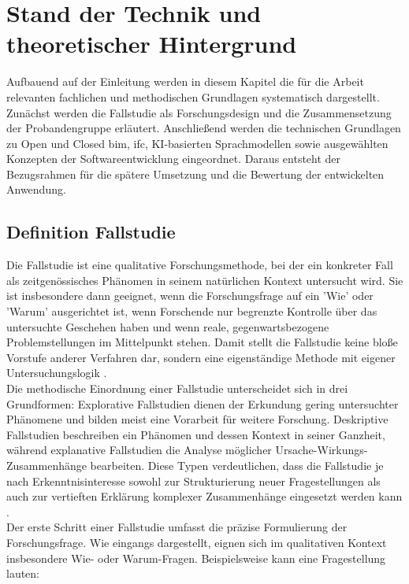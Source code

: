 \chapter{\textbf{Stand der Technik und theoretischer Hintergrund}}
\label{chap:state-of-the-art}

Aufbauend auf der Einleitung werden in diesem Kapitel die für die Arbeit relevanten fachlichen und methodischen Grundlagen systematisch dargestellt.
Zunächst werden die Fallstudie als Forschungsdesign und die Zusammensetzung der Probandengruppe erläutert.
Anschließend werden die technischen Grundlagen zu Open und Closed \gls{bim}, \gls{ifc}, KI-basierten Sprachmodellen sowie ausgewählten Konzepten der Softwareentwicklung eingeordnet.
Daraus entsteht der Bezugsrahmen für die spätere Umsetzung und die Bewertung der entwickelten Anwendung.

\section{Definition Fallstudie}
\label{sec:fallstudie}

Die Fallstudie ist eine qualitative Forschungsmethode, bei der ein konkreter Fall als zeitgenössisches Phänomen in seinem natürlichen Kontext untersucht wird.
Sie ist insbesondere dann geeignet, wenn die Forschungsfrage auf ein 'Wie' oder 'Warum' ausgerichtet ist, wenn Forschende nur begrenzte Kontrolle über das untersuchte Geschehen haben und wenn reale, gegenwartsbezogene Problemstellungen im Mittelpunkt stehen.
Damit stellt die Fallstudie keine bloße Vorstufe anderer Verfahren dar, sondern eine eigenständige Methode mit eigener Untersuchungslogik \cite{hertrich2020forschungsmethodefallstudien}. \\

Die methodische Einordnung einer Fallstudie unterscheidet sich in drei Grundformen: Explorative Fallstudien dienen der Erkundung gering untersuchter Phänomene und bilden meist eine Vorarbeit für weitere Forschung.
Deskriptive Fallstudien beschreiben ein Phänomen und dessen Kontext in seiner Ganzheit, während explanative Fallstudien die Analyse möglicher Ursache-Wirkungs-Zusammenhänge bearbeiten.
Diese Typen verdeutlichen, dass die Fallstudie je nach Erkenntnisinteresse sowohl zur Strukturierung neuer Fragestellungen als auch zur vertieften Erklärung komplexer Zusammenhänge eingesetzt werden kann \cite{hollweck2016casestudy}. \\

Der erste Schritt einer Fallstudie umfasst die präzise Formulierung der Forschungsfrage. Wie eingangs dargestellt, eignen sich im qualitativen Kontext insbesondere Wie- oder Warum-Fragen.
Beispielsweise kann eine Fragestellung lauten:

